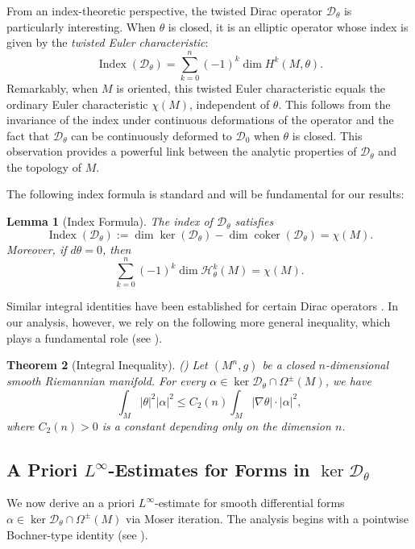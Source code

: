 \documentclass[12pt, twoside]{article}
\newtheorem{theorem}{Theorem}[section]
\newtheorem{lemma}[theorem]{Lemma}
\theoremstyle{definition}
\numberwithin{equation}{section}
\begin{document}
	From an index-theoretic perspective, the twisted Dirac operator \(\mathcal{D}_{\theta}\) is particularly interesting. When \(\theta\) is closed, it is an elliptic operator whose index is given by the \emph{twisted Euler characteristic}:
	\[
	\operatorname{Index}(\mathcal{D}_{\theta})=\sum_{k=0}^{n}(-1)^k\dim H^k(M,\theta).
	\]
	Remarkably, when \(M\) is oriented, this twisted Euler characteristic equals the ordinary Euler characteristic \(\chi(M)\), independent of \(\theta\). This follows from the invariance of the index under continuous deformations of the operator and the fact that \(\mathcal{D}_{\theta}\) can be continuously deformed to \(\mathcal{D}_0\) when \(\theta\) is closed. This observation provides a powerful link between the analytic properties of \(\mathcal{D}_{\theta}\) and the topology of \(M\).
	
	The following index formula is standard and will be fundamental for our results:
	
	\begin{lemma}[Index Formula] \label{lem:index-formula} 
		The index of \(\mathcal{D}_{\theta}\) satisfies
		\[
		\operatorname{Index}(\mathcal{D}_{\theta})
		:=\dim\ker(\mathcal{D}_{\theta})-\dim\operatorname{coker}(\mathcal{D}_{\theta})
		=\chi(M).
		\]
		Moreover, if \(d\theta=0\), then
		\[
		\sum_{k=0}^{n}(-1)^{k}
		\dim\mathcal{H}_{\theta}^{k}(M)
		=\chi(M).
		\]
	\end{lemma}
Similar integral identities have been established for certain Dirac operators \cite{Chen2020, Chen2024b}. In our analysis, however, we rely on the following more general inequality, which plays a fundamental role (see \cite[Theorem 3.4]{Huang2025}).
\begin{theorem}[Integral Inequality]\label{thm:integral-identity} 
	(\cite[Theorem 3.4]{Huang2025})  
	Let \((M^{n},g)\) be a closed \(n\)-dimensional smooth Riemannian manifold. 
	For every \(\alpha\in\ker\mathcal{D}_{\theta}\cap\Omega^{\pm}(M)\), we have
	\[
	\int_{M}|\theta|^{2}|\alpha|^{2}
	\le C_{2}(n)\int_{M}|\nabla\theta|\cdot|\alpha|^{2},
	\]
	where \(C_{2}(n)>0\) is a constant depending only on the dimension \(n\).
\end{theorem}


	\subsection{A Priori \(L^{\infty}\)-Estimates for Forms in \(\ker\mathcal{D}_{\theta}\)}
	
	We now derive an a priori \(L^{\infty}\)-estimate for smooth differential forms \(\alpha\in\ker\mathcal{D}_{\theta}\cap\Omega^{\pm}(M)\) via Moser iteration. 
	The analysis begins with a pointwise Bochner-type identity (see \cite[Page 181]{Petersen1998}).
	
\end{document}
